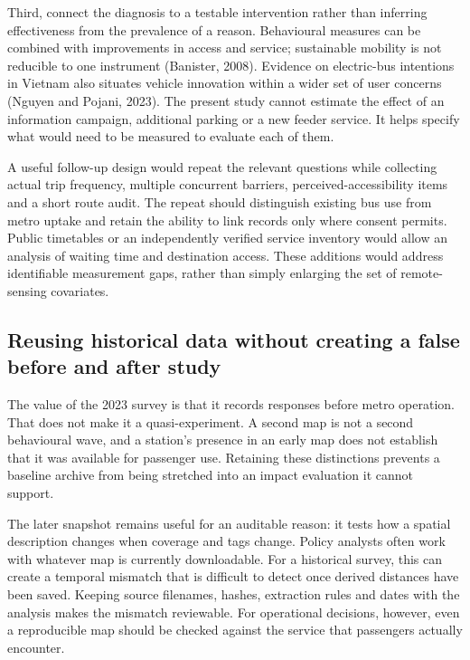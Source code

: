 \documentclass[
  11pt,
  a4paper,
]{article}
\begin{document}
Third, connect the diagnosis to a testable intervention rather than
inferring effectiveness from the prevalence of a reason. Behavioural
measures can be combined with improvements in access and service;
sustainable mobility is not reducible to one instrument (Banister,
2008). Evidence on electric-bus intentions in Vietnam also situates
vehicle innovation within a wider set of user concerns (Nguyen and
Pojani, 2023). The present study cannot estimate the effect of an
information campaign, additional parking or a new feeder service. It
helps specify what would need to be measured to evaluate each of them.

A useful follow-up design would repeat the relevant questions while
collecting actual trip frequency, multiple concurrent barriers,
perceived-accessibility items and a short route audit. The repeat should
distinguish existing bus use from metro uptake and retain the ability to
link records only where consent permits. Public timetables or an
independently verified service inventory would allow an analysis of
waiting time and destination access. These additions would address
identifiable measurement gaps, rather than simply enlarging the set of
remote-sensing covariates.

\subsection{Reusing historical data without creating a false before and
after
study}\label{reusing-historical-data-without-creating-a-false-before-and-after-study}

The value of the 2023 survey is that it records responses before metro
operation. That does not make it a quasi-experiment. A second map is not
a second behavioural wave, and a station's presence in an early map does
not establish that it was available for passenger use. Retaining these
distinctions prevents a baseline archive from being stretched into an
impact evaluation it cannot support.

The later snapshot remains useful for an auditable reason: it tests how
a spatial description changes when coverage and tags change. Policy
analysts often work with whatever map is currently downloadable. For a
historical survey, this can create a temporal mismatch that is difficult
to detect once derived distances have been saved. Keeping source
filenames, hashes, extraction rules and dates with the analysis makes
the mismatch reviewable. For operational decisions, however, even a
reproducible map should be checked against the service that passengers
actually encounter.
\end{document}
